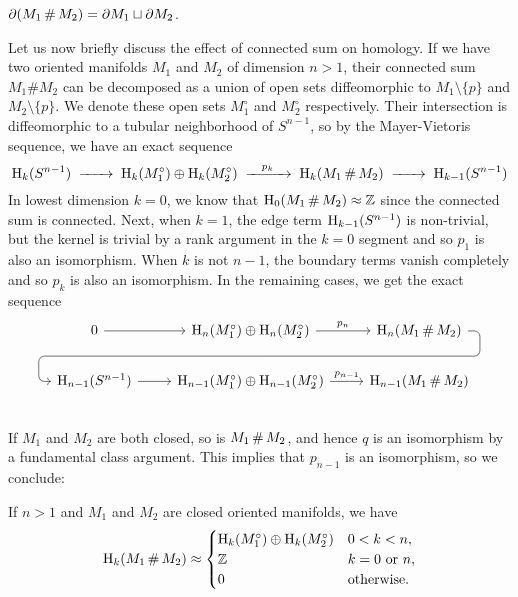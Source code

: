 \begin{corollary}
	$\partial(M_1\+M_2) = \partial M_1\sqcup \partial M_2$.
\end{corollary}

Let us now briefly discuss the effect of connected sum on homology. If we have two oriented manifolds $M_1$ and $M_2$ of dimension $n>1$, their connected sum $M_1\# M_2$ can be decomposed as a union of open sets diffeomorphic to $M_1\setminus\{p\}$ and $M_2\setminus\{p\}$. We denote these open sets $M_1^\circ$ and $M_2^\circ$ respectively. Their intersection is diffeomorphic to a tubular neighborhood of $S^{n-1}$, so by the Mayer-Vietoris sequence, we have an exact sequence
\[
	\H_k(S^{n-1})\lkxto \H_k(M_1^\circ)\oplus \H_k(M_2^\circ)\lkxto[p_k] \H_k(M_1\+M_2)\lkxto \H_{k-1}(S^{n-1})
\]
In lowest dimension $k=0$, we know that $\H_0(M_1\+ M_2)\cong \Z$ since the connected sum is connected. Next, when $k=1$, the edge term $\operatorname{H}_{k-1}(S^{n-1})$ is non-trivial, but the kernel is trivial by a rank argument in the $k=0$ segment and so $p_1$ is also an isomorphism.
When $k$ is not $n-1$, the boundary terms vanish completely and so $p_k$ is also an isomorphism. In the remaining cases, we get the exact sequence
\begin{equation}\label{eq:connected-sum-cohomology}
%
	\begin{tikzcd}
		0\rar & {\H_n(M_1^\circ)\oplus \H_n(M_2^\circ)} \rar{p_n}\snakenode{X} & {\H_n(M_1\+M_2)}\snakearrow{X} \\
		\H_{n-1}(S^{n-1}) \rar & {\H_{n-1}(M_1^\circ)\oplus \H_{n-1}(M_2^\circ)}\rar{p_{n-1}} & {\H_{n-1}(M_1\+M_2)} \\
\end{tikzcd}
\end{equation}
If $M_1$ and $M_2$ are both closed, so is $M_1\+M_2$, and hence $q$ is an isomorphism by a fundamental class argument. This implies that $p_{n-1}$ is an isomorphism, so we conclude:

\begin{proposition}\label{prop:homology-connected-sum-closed}
	If $n>1$ and $M_1$ and $M_2$ are closed oriented manifolds, we have
	\[
		\H_k(M_1\+M_2) \cong \begin{cases}
			\H_k(M_1^\circ)\oplus \H_k(M_2^\circ) & 0 < k < n,\\
			\Z & k=0\textrm{ or }n,\\
			0 & \textrm{otherwise.}
		\end{cases}
	\]
\end{proposition}

